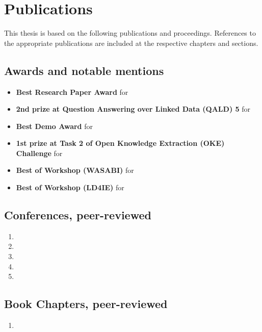 \chapter*{Publications}

This thesis is based on the following publications and proceedings.
References to the appropriate publications are included at the respective chapters and sections.

\bigskip
\section*{Awards and notable mentions}
\begin{itemize}
    \item \textbf{Best Research Paper Award}  for  
    \item \textbf{2nd prize at Question Answering over Linked Data (QALD) 5} for   
    \item \textbf{Best Demo Award} for  
    \item \textbf{1st prize at Task 2 of Open Knowledge Extraction (OKE) Challenge}  for 
    \item \textbf{Best of Workshop (WASABI)}  for 
    \item \textbf{Best of Workshop (LD4IE)} for 
\end{itemize}


\section*{Conferences, peer-reviewed}
\begin{enumerate}
 	\item {}
    \item {}
    \item {}
    \item {}
     \item {}
\end{enumerate}


\section*{Book Chapters, peer-reviewed}
\begin{enumerate}[resume]
\item {}
\end{enumerate}


